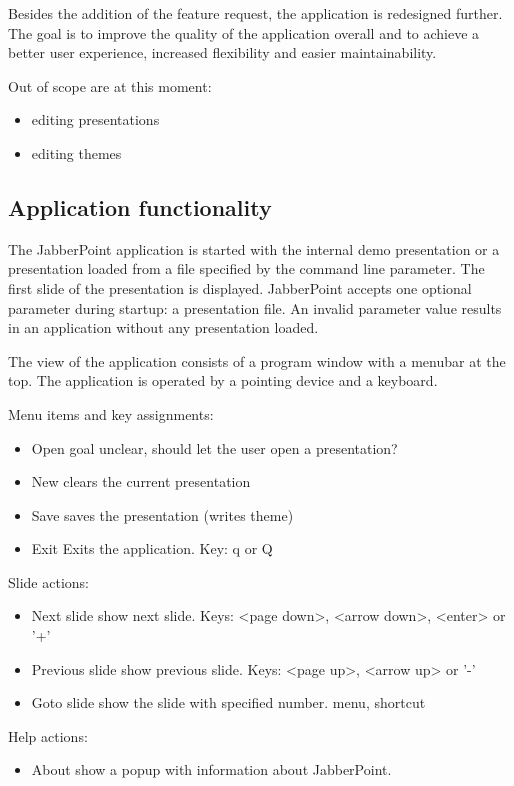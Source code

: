 \documentclass[a4paper]{article}
\begin{document}
Besides the addition of the feature request, the application is redesigned further. The goal is to improve the quality of the application overall and to achieve a better user experience, increased flexibility and easier maintainability.  

Out of scope are at this moment:
\begin{itemize}
\item editing presentations
\item editing themes 
\end{itemize}

\subsection{Application functionality}
The JabberPoint application is started with the internal demo presentation or a presentation loaded from a file specified by the command line parameter. The first slide of the presentation is displayed.
JabberPoint accepts one optional parameter during startup: a presentation file. 
An invalid parameter value results in an application without any presentation loaded.

The view of the application consists of a program window with a menubar at the top. The application is operated by a pointing device and a keyboard. 

Menu items and key assignments:
\begin{itemize}
\item{Open} goal unclear, should let the user open a presentation? 
\item{New} clears the current presentation
\item{Save} saves the presentation (writes theme)
\item{Exit} Exits the application. Key: q or Q
\end{itemize}

Slide actions:
\begin{itemize}
\item{Next slide} show next slide. Keys: \textless page down\textgreater, \textless arrow down\textgreater, \textless enter\textgreater{ }or '+'
\item{Previous slide} show previous slide. Keys: \textless page up\textgreater, \textless arrow up\textgreater{ }or '-'
\item{Goto slide} show the slide with specified number. menu, shortcut
\end{itemize}

Help actions:
\begin{itemize}
\item{About} show a popup with information about JabberPoint.
\end{itemize}
\end{document}
